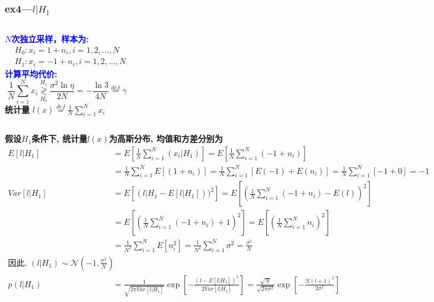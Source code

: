 \begin{frame}[shrink]
\frametitle{ex4---$l|H_1$}
\begin{columns}
	\textcolor{blue}{\textbf{$N$次独立采样，样本为:}}
	\begin{align*}
	&H_0: x_i=1+n_i, i=1,2,\dots,N\\
	&H_1: x_i=-1+n_i, i=1,2,\dots,N
	\end{align*}
	\textcolor{blue}{\textbf{计算平均代价:}}
	\[
	\frac{1}{N}\sum\limits_{i=1}^{N}x_i\mathop{\gtrless}\limits_{H_0}^{H_1}\frac{\sigma^2\ln\eta}{2N}=-\frac{\ln 3}{4N}\mathop{=}\limits^{def}\gamma
	\]
	\textbf{统计量  }\qquad $l(x)\mathop{=}\limits^{def}\frac{1}{N}\sum\limits_{i=1}^{N}x_i$\\
\end{columns}
\textbf{假设$H_1$条件下, 统计量$l(x)$为高斯分布, 均值和方差分别为}
\begin{align*}
E[l|H_1]&=E\left[\frac{1}{N}\sum\limits_{i=1}^{N}(x_i|H_1)\right]=E\left[\frac{1}{N}\sum\limits_{i=1}^{N}(-1+n_i)\right]\\
&=\frac{1}{N}\sum\limits_{i=1}^{N}E[(1+n_i)]=\frac{1}{N}\sum\limits_{i=1}^{N}[E(-1)+E(n_i)]=\frac{1}{N}\sum\limits_{i=1}^{N}[-1+0]=-1\\
Var[l|H_1]&=E\left[(l|H_1-E[l|H_1]))^2\right]=E\left[\left(\frac{1}{N}\sum\limits_{i=1}^{N}(-1+n_i)-E(l)\right)^2\right]\\
&=E\left[\left(\frac{1}{N}\sum\limits_{i=1}^{N}(-1+n_i)+1\right)^2\right]=E\left[\left(\frac{1}{N}\sum\limits_{i=1}^{N}n_i\right)^2\right]\\
&=\frac{1}{N^2}\sum\limits_{i=1}^{N}E[n_i^2]=\frac{1}{N^2}\sum\limits_{i=1}^{N}\sigma^2=\frac{\sigma^2}{N}\\
\textbf{因此, }(l|H_1)\sim\mathcal{N}(-1,\frac{\sigma^2}{N})\\
p(l|H_1)&=\frac{1}{\sqrt{2\pi Var[l|H_1]}}\exp\left[-\frac{(l-E[l|H_1])^2}{2 Var[l|H_1]}\right]=\frac{\sqrt{N}}{\sqrt{2\pi\sigma^2}}\exp\left[-\frac{N(l+1)^2}{2\sigma^2}\right]
\end{align*}
\end{frame}


